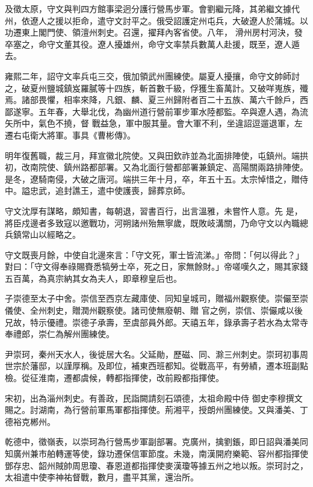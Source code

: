 \begin{pinyinscope}
 及徵太原，守文與判四方館事梁迥分護行營馬步軍。會劉繼元降，其弟繼文據代州，依遼人之援以拒命，遣守文討平之。俄受詔護定州屯兵，大破遼人於蒲城。以功遷東上閣門使、領澶州刺史。召還，擢拜內客省使。八年，
 滑州房村河決，發卒塞之，命守文董其役。遼人擾雄州，命守文率禁兵數萬人赴援，既至，遼人遁去。



 雍熙二年，詔守文率兵屯三交，俄加領武州團練使。屬夏人擾攘，命守文帥師討之，破夏州鹽城鎮岌羅膩等十四族，斬首數千級，俘獲生畜萬計。又破咩嵬族，殲焉。諸部畏懼，相率來降，凡銀、麟、夏三州歸附者百二十五族、萬六千餘戶，西鄙遂寧。五年春，大舉北伐，為幽州道行營前軍步軍水陸都監。卒與遼人遇，為流矢所中，氣色不撓，督
 戰益急，軍中服其量。會大軍不利，坐違詔逗遛退軍，左遷右屯衛大將軍。事具《曹彬傳》。



 明年復舊職，裁三月，拜宣徽北院使。又與田欽祚並為北面排陣使，屯鎮州。端拱初，改南院使、鎮州路都部署。又為北面行營都部署兼鎮定、高陽關兩路排陣使。是冬，遼騎南侵，大破之唐河。端拱三年十月，卒，年五十五。太宗悼惜之，贈侍中。謚忠武，追封譙王，遣中使護喪，歸葬京師。



 守文沈厚有謀略，頗知書，每朝退，習書百行，出言溫雅，未嘗忤人意。先
 是，將臣戍邊者多致寇以邀戰功，河朔諸州殆無寧歲，既敗岐溝關，乃命守文以內職總兵鎮常山以經略之。



 守文既喪月餘，中使自北邊來言：「守文死，軍士皆流涕。」帝問：「何以得此？」對曰：「守文得奉祿賜賚悉犒勞士卒，死之日，家無餘財。」帝嗟嘆久之，賜其家錢五百萬，為真宗納其女為夫人，即章穆皇后也。



 子崇德至太子中舍。崇信至西京左藏庫使、同知皇城司，贈福州觀察使。崇儼至崇儀使、全州刺史，贈潤州觀察使。諸司使無廢朝、贈
 官之例，崇信、崇儼咸以後兄故，特示優禮。崇德子承壽，至虞部員外郎。天禧五年，錄承壽子若水為太常寺奉禮郎，崇仁為解州團練使。



 尹崇珂，秦州天水人，後徙居大名。父延勛，歷磁、同、滁三州刺史。崇珂初事周世宗於藩邸，以謹厚稱。及即位，補東西班都知。從戰高平，有勞績，遷本班副點檢。從征淮南，遷都虞候，轉都指揮使，改前殿都指揮使。



 宋初，出為淄州刺史。有善政，民詣闕請刻石頌德，太祖命殿中侍
 御史李穆撰文賜之。討湖南，為行營前軍馬軍都指揮使。荊湘平，授朗州團練使。又與潘美、丁德裕克郴州。



 乾德中，徵嶺表，以崇珂為行營馬步軍副部署。克廣州，擒劉鋹，即日詔與潘美同知廣州兼市舶轉運等使，錄功遷保信軍節度。未幾，南漢開府樂範、容州都指揮使鄧存忠、韶州賊帥周思瓊、春恩道都指揮使麥漢瓊等據五州之地以叛。崇珂討之，太祖遣中使李神祐督戰，數月，盡平其黨，還治所。




\end{pinyinscope}

